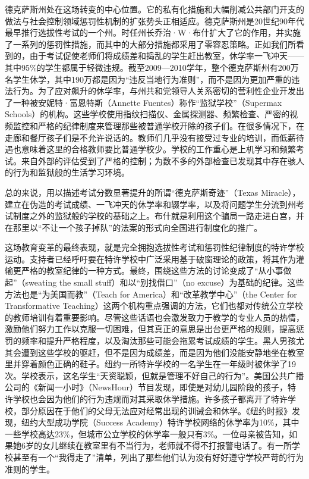 \documentclass[fontset=fandol, a4paper, 12pt, openright]{ctexbook}
\begin{document}
德克萨斯州处在这场转变的中心位置。它的私有化措施和大幅削减公共部门开支的做法与社会控制领域惩罚性机制的扩张势头正相适应。德克萨斯州是20世纪90年代最早推行选拔性考试的一个州。时任州长乔治·W·布什扩大了它的作用，并实施了一系列的惩罚性措施，而其中的大部分措施都采用了零容忍策略。正如我们所看到的，由于考试促使老师们将成绩差和捣乱的学生赶出教室，休学率一飞冲天——其中95\%的学生都属于轻微违规。截至2009—2010学年，整个德克萨斯州有200万名学生休学，其中190万都是因为“违反当地行为准则”，而不是因为更加严重的违法行为。为了应对飙升的休学率，与州共和党领导人关系密切的营利性企业开发出了一种被安妮特·富恩特斯（Annette Fuentes）称作“监狱学校”（Supermax Schools）的机构。这些学校使用指纹扫描仪、金属探测器、频繁检查、严密的视频监控和严格的纪律制度来管理那些被普通学校开除的孩子们。在很多情况下，在走廊和餐厅孩子们是不允许说话的。教师们几乎没有接受过专业的培训，而低薪待遇也意味着这里的合格教师要比普通学校少。学校的工作重心是上机学习和频繁考试。来自外部的评估受到了严格的控制；为数不多的外部检查已发现其中存在骇人的行为和监狱般的生活学习环境。

总的来说，用以描述考试分数显著提升的所谓“德克萨斯奇迹”（Texas Miracle），建立在伪造的考试成绩、一飞冲天的休学率和辍学率，以及将问题学生分流到州考试制度之外的监狱般的学校的基础之上。布什就是利用这个骗局一路走进白宫，并在那里以“不让一个孩子掉队”的法案的形式向全国进行制度化的推广。

这场教育变革的最终表现，就是完全拥抱选拔性考试和惩罚性纪律制度的特许学校运动。支持者已经呼吁要在特许学校中广泛采用基于破窗理论的政策，将其作为灌输更严格的教室纪律的一种方式。最终，围绕这些方法的讨论变成了“从小事做起”（sweating the small stuff）和以“别找借口”（no excuse）为基础的纪律。这些方法也是“为美国而教”（Teach for America）和“改革教学中心”（the Center for Transformative Teaching）这两个机构重点强调的方法，它们也都对传统公立学校的教师培训有着重要影响。尽管这些话语也会激发致力于教学的专业人员的热情，激励他们努力工作以克服一切困难，但其真正的意思是出台更严格的规则，提高惩罚的频率和提升严格程度，以及淘汰那些可能会拖累考试成绩的学生。黑人男孩尤其会遭到这些学校的驱赶，但不是因为成绩差，而是因为他们没能安静地坐在教室里并穿着颜色正确的鞋子。纽约一所特许学校的一名学生在一年级时被休学了19次。学校表示，这名学生“天资聪颖，但就是管理不好自己的行为”。美国公共广播公司的《新闻一小时》（NewsHour）节目发现，即使是对幼儿园阶段的孩子，特许学校也会因为他们的行为违规而对其采取休学措施。许多孩子都离开了特许学校，部分原因在于他们的父母无法应对经常出现的训诫会和休学。《纽约时报》发现，纽约大型成功学院（Success Academy）特许学校网络的休学率为10\%，其中一些学校高达23\%，但城市公立学校的休学率一般只有3\%。一位母亲被告知，如果她6岁的女儿继续在教室里有不当行为，老师就不得不打报警电话了。有一所学校甚至有一个“我得走了”清单，列出了那些他们认为没有好好遵守学校严苛的行为准则的学生。
\end{document}
